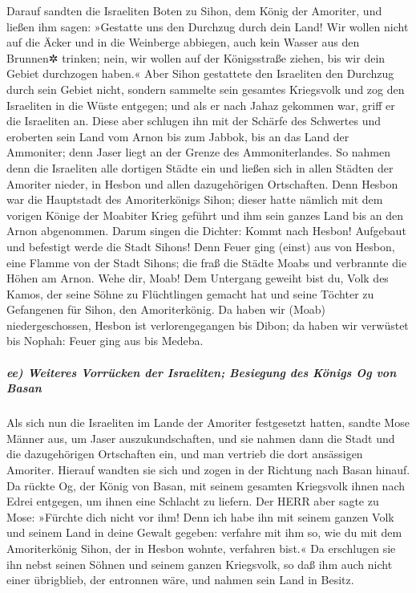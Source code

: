 Darauf sandten die Israeliten Boten zu Sihon, dem König
der Amoriter, und ließen ihm sagen: »Gestatte uns den
Durchzug durch dein Land! Wir wollen nicht auf die Äcker und in die
Weinberge abbiegen, auch kein Wasser aus den Brunnen✲ trinken; nein, wir
wollen auf der Königsstraße ziehen, bis wir dein Gebiet durchzogen
haben.« Aber Sihon gestattete den Israeliten den Durchzug
durch sein Gebiet nicht, sondern sammelte sein gesamtes Kriegsvolk und
zog den Israeliten in die Wüste entgegen; und als er nach Jahaz gekommen
war, griff er die Israeliten an. Diese aber schlugen ihn
mit der Schärfe des Schwertes und eroberten sein Land vom Arnon bis zum
Jabbok, bis an das Land der Ammoniter; denn Jaser liegt an der Grenze
des Ammoniterlandes. So nahmen denn die Israeliten alle
dortigen Städte ein und ließen sich in allen Städten der Amoriter
nieder, in Hesbon und allen dazugehörigen Ortschaften.
Denn Hesbon war die Hauptstadt des Amoriterkönigs Sihon;
dieser hatte nämlich mit dem vorigen Könige der Moabiter Krieg geführt
und ihm sein ganzes Land bis an den Arnon abgenommen.
Darum singen die Dichter: Kommt nach Hesbon! Aufgebaut
und befestigt werde die Stadt Sihons! Denn Feuer ging
(einst) aus von Hesbon, eine Flamme von der Stadt Sihons; die fraß die
Städte Moabs und verbrannte die Höhen am Arnon. Wehe dir,
Moab! Dem Untergang geweiht bist du, Volk des Kamos, der seine Söhne zu
Flüchtlingen gemacht hat und seine Töchter zu Gefangenen für Sihon, den
Amoriterkönig. Da haben wir (Moab) niedergeschossen,
Hesbon ist verlorengegangen bis Dibon; da haben wir verwüstet bis
Nophah: Feuer ging aus bis Medeba.

\hypertarget{ee-weiteres-vorruxfccken-der-israeliten-besiegung-des-kuxf6nigs-og-von-basan}{%
\subparagraph{ee) Weiteres Vorrücken der Israeliten; Besiegung des
Königs Og von
Basan}\label{ee-weiteres-vorruxfccken-der-israeliten-besiegung-des-kuxf6nigs-og-von-basan}}

Als sich nun die Israeliten im Lande der Amoriter
festgesetzt hatten, sandte Mose Männer aus, um Jaser
auszukundschaften, und sie nahmen dann die Stadt und die dazugehörigen
Ortschaften ein, und man vertrieb die dort ansässigen Amoriter.
Hierauf wandten sie sich und zogen in der Richtung nach
Basan hinauf. Da rückte Og, der König von Basan, mit seinem gesamten
Kriegsvolk ihnen nach Edrei entgegen, um ihnen eine Schlacht zu liefern.
Der HERR aber sagte zu Mose: »Fürchte dich nicht vor ihm!
Denn ich habe ihn mit seinem ganzen Volk und seinem Land in deine Gewalt
gegeben: verfahre mit ihm so, wie du mit dem Amoriterkönig Sihon, der in
Hesbon wohnte, verfahren bist.« Da erschlugen sie ihn
nebst seinen Söhnen und seinem ganzen Kriegsvolk, so daß ihm auch nicht
einer übrigblieb, der entronnen wäre, und nahmen sein Land in Besitz.

